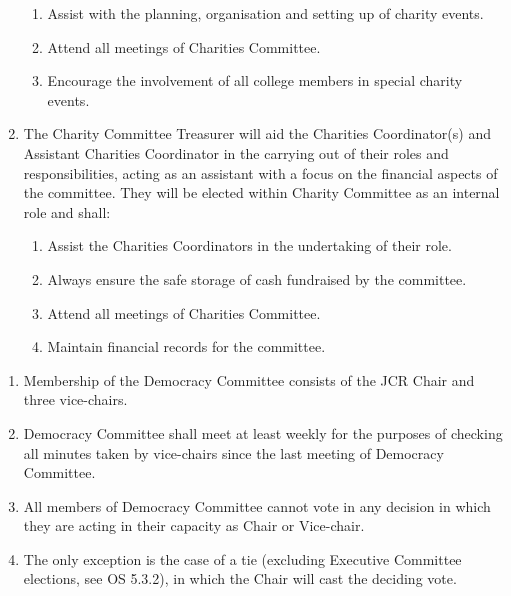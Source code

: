 \begin{enumerate}
\begin{enumerate}
        \item Assist with the planning, organisation and setting up of charity events. 
        \item Attend all meetings of Charities Committee.
        \item Encourage the involvement of all college members in special charity events.
    \end{enumerate}
    \item The Charity Committee Treasurer will aid the Charities Coordinator(s) and Assistant Charities Coordinator in the carrying out of their roles and responsibilities, acting as an assistant with a focus on the financial aspects of the committee. They will be elected within Charity Committee as an internal role and shall:
    \begin{enumerate}
        \item Assist the Charities Coordinators in the undertaking of their role. 
        \item Always ensure the safe storage of cash fundraised by the committee.
        \item Attend all meetings of Charities Committee.
        \item Maintain financial records for the committee.
    \end{enumerate}
\end{enumerate}


\begin{enumerate}
    \item Membership of the Democracy Committee consists of the JCR Chair and three vice-chairs.
    \item Democracy Committee shall meet at least weekly for the purposes of checking all minutes taken by vice-chairs since the last meeting of Democracy Committee.
    \item All members of Democracy Committee cannot vote in any decision in which they are acting in their capacity as Chair or Vice-chair.
    \item The only exception is the case of a tie (excluding Executive Committee elections, see OS 5.3.2), in which the Chair will cast the deciding vote.
\end{enumerate}




